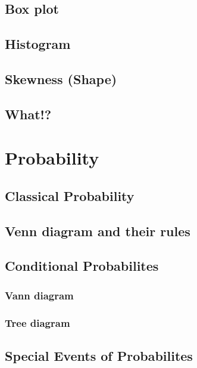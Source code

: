 \documentclass[a4paper]{article}
\begin{document}
\subsection{Box plot}

\subsection{Histogram}

\begin{defi}

\end{defi}

\subsection{Skewness (Shape)}

\subsection{What!?}
\section{Probability}
\subsection{Classical Probability}

\subsection{Venn diagram and their rules}
\begin{defi}

\end{defi}

\subsection{Conditional Probabilites}
\subsubsection{Vann diagram}

\subsubsection{Tree diagram}

\subsection{Special Events of Probabilites}
\end{document}
